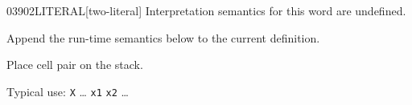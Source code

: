 \begin{worddef}{0390}{2LITERAL}[two-literal]
\interpret
	Interpretation semantics for this word are undefined.

\compile

	Append the run-time semantics below to the current definition.

\runtime

	Place cell pair  on the stack.

	\begin{rationale} %
		Typical use:
			\word{:} \texttt{X} {\ldots}
				\word{[} \texttt{x1} \texttt{x2} \word{]} 
			{\ldots} \word{;}
	\end{rationale}

	\begin{testing}
		\\

		 \\
		 \\
	\end{testing}
\end{worddef}


